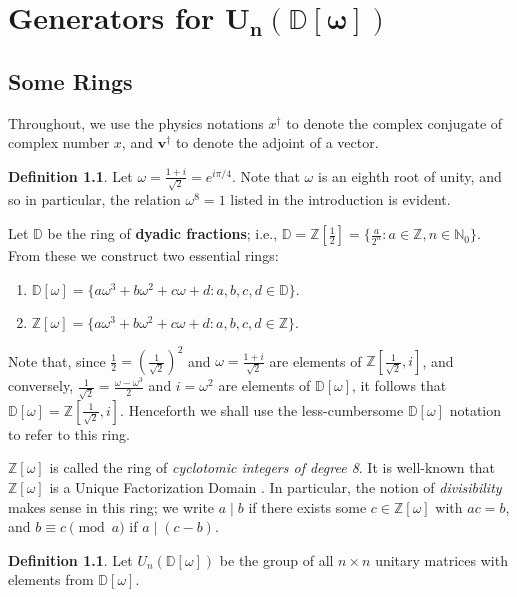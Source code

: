 \documentclass{dalthesis}
\theoremstyle{theorem}
\theoremstyle{definition}
\newtheorem{definition}[theorem]{Definition}
\theoremstyle{definition}  %
\theoremstyle{definition}
\newcommand{\Z}{\mathbb{Z}}
\newcommand{\N}{\mathbb{N}}
\newcommand{\D}{\mathbb{D}}
\renewcommand{\:}{\mathbin{:}}
\newcommand{\divides}{\mid}
\begin{document}
\chapter{Generators for
  \texorpdfstring{$\boldsymbol{U_n(\D[\omega])}$}{U^^e2^^82^^99(^^e2^^85^^85[^^cf^^89])}}

\section{Some Rings}

Throughout, we use the physics notations $x^\dagger$ to denote the
complex conjugate of complex number $x$, and $\boldsymbol{v}^\dagger$
to denote the adjoint of a vector.

\begin{definition}
\label{RingsDef}
Let $\omega = \frac{1+i}{\sqrt{2}} = e^{i\pi/4}.$ Note that $\omega$ is an eighth root of unity, and so in particular, the relation $\omega^8 = 1$ listed in the introduction is evident.

Let $\D$ be the ring of \textbf{dyadic fractions}; i.e., $\D = \Z[\frac{1}{2}] = \{\frac{a}{2^n}\:a\in\Z,n\in\N_0\}$. From these we construct two essential rings:
\begin{enumerate}
\item$\D[\omega] = \{a\omega^3+b\omega^2+c\omega+d\:a,b,c,d\in\D\}.$
\item$\Z[\omega] = \{a\omega^3+b\omega^2+c\omega+d\:a,b,c,d\in\Z\}.$
\end{enumerate}
\end{definition}

Note that, since $\frac12=(\frac1{\sqrt2})^2$ and $\omega=\frac{1+i}{\sqrt{2}}$ are elements of $\Z[\frac{1}{\sqrt{2}},i]$, and conversely, $\frac{1}{\sqrt{2}}=\frac{\omega-\omega^3}{2}$ and $i=\omega^2$ are elements of $\D[\omega]$, it follows that $\D[\omega] = \Z[\frac{1}{\sqrt{2}},i].$ Henceforth we shall use the less-cumbersome $\D[\omega]$ notation to refer to this ring. 

$\Z[\omega]$ is called the ring of \textit{cyclotomic integers of degree 8}. It is well-known that $\Z[\omega]$ is a Unique Factorization Domain {\cite{Washington}}. In particular, the notion of {\em divisibility} makes sense in this ring; we write $a\divides b$ if there exists some $c\in\Z[\omega]$ with $ac=b$, and $b\equiv c\pmod a$ if $a\divides(c-b)$.

\begin{definition}
\label{U2nDef}
Let $U_{n}(\D[\omega])$ be the group of all $n\times n$ unitary matrices with elements from $\D[\omega].$
\end{definition}
\end{document}
